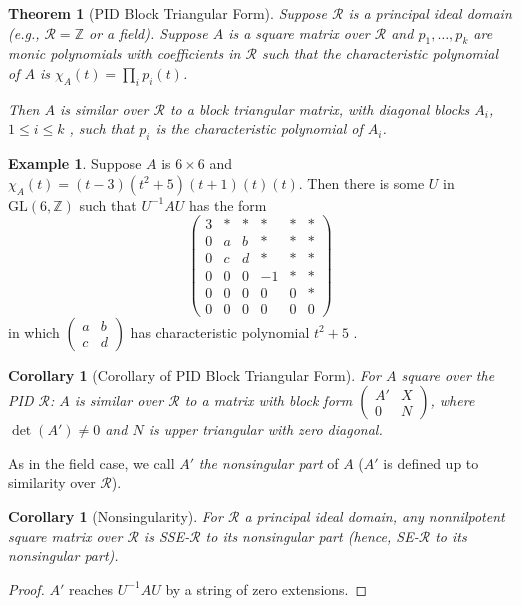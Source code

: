 \documentclass{amsart}
\newtheorem{thm}[equation]{Theorem}
\newtheorem{coro}[equation]{Corollary}
\theoremstyle{definition}
\newtheorem{ex}[equation]{Example}
\theoremstyle{definition}
\newcommand{\Z}{\mathbb Z}
\numberwithin{equation}{subsection}
\begin{document}
\begin{thm} [PID Block Triangular Form] \cite{Newman}\label{thm:PIDblocktri}
   Suppose $\mathcal R$ is a principal ideal domain (e.g.,
   $\mathcal R=\Z$ or a field).
   Suppose $A$ is a square matrix over $\mathcal R$ and
   $p_1, \dots , p_k$ are monic polynomials with coefficients in
   $\mathcal R$ such that the characteristic polynomial of $A$ is
   $\chi_A(t) = \prod_i p_i(t)$.

   Then $A$ is similar over $\mathcal R$ to a block triangular matrix,
   with diagonal blocks $A_i$, $1\leq i \leq k$ ,
   such that $p_i$ is the characteristic polynomial of $A_i$.
   \end{thm}
\begin{ex}
   Suppose $A$ is $6\times 6$
and $\chi_A(t)=(t-3)(t^2+5)(t+1)(t)(t)$.
   Then  there is some $U$ in $\text{GL}(6, \Z)$ such that
   $U^{-1}AU$ has the form
\[
\left( \begin{smallmatrix}
     3&*&*   &*&*&* \\
     0&a&b   &*&*&* \\
     0&c&d   &*&*&* \\
     0&0&0   &-1&*&* \\
     0&0&0   &0&0&* \\
     0&0&0   &0&0&0
   \end{smallmatrix}
   \right)
   \]
in which  $\begin{pmatrix} a&b\\c&d \end{pmatrix}$
   has characteristic polynomial $t^2 +5$ .
   \end{ex}
\begin{coro}[Corollary of PID Block Triangular Form]
 For $A$ square over the PID $\mathcal R$:
      $A$ is similar over $\mathcal R$ to a matrix
   with block form
$\begin{pmatrix} A' & X \\ 0 & N \end{pmatrix}$,
   where $\det (A') \neq 0$ and $N$ is upper triangular with
   zero diagonal.
\end{coro}
   As in the field case, we  call
   $A'$ {\it the nonsingular part} of $A$ ($A'$ is defined up to similarity
   over $\mathcal R$).
\begin{coro}[Nonsingularity]
For $\mathcal R$ a principal ideal domain,
   any nonnilpotent square matrix over $\mathcal R$ is
   SSE-$\mathcal R$  to its nonsingular part
   (hence, SE-$\mathcal R$ to its nonsingular part).
\end{coro}
\begin{proof}
 $A'$ reaches $U^{-1}AU$ by a string of zero
     extensions.
     \end{proof}
\end{document}
